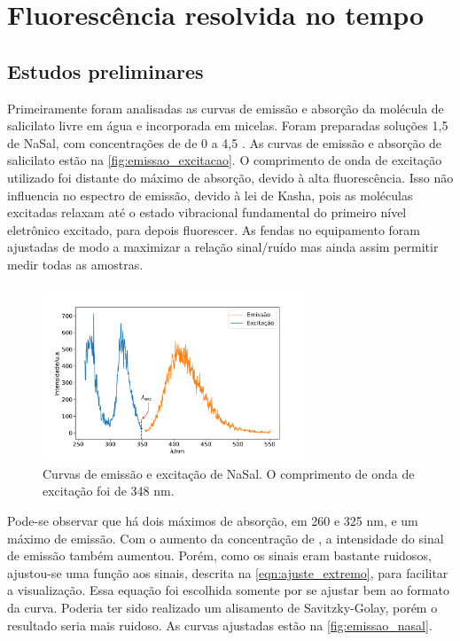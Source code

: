 	\chapter{Fluorescência resolvida no tempo}
	
	\section{Estudos preliminares}  
	
	Primeiramente foram analisadas as curvas de emissão e absorção da molécula de salicilato livre em água e incorporada em micelas. Foram preparadas soluções 1,5 \mM{} de NaSal, com concentrações de \TTAB{} de 0 a 4,5 \mM. As curvas de emissão e absorção de salicilato estão na \autoref{fig:emissao_excitacao}. O comprimento de onda de excitação utilizado foi distante do máximo de absorção, devido à alta fluorescência. Isso não influencia no espectro de emissão, devido à lei de Kasha, pois as moléculas excitadas relaxam até o estado vibracional fundamental do primeiro nível eletrônico excitado, para depois fluorescer. As fendas no equipamento foram ajustadas de modo a maximizar a relação sinal/ruído mas ainda assim permitir medir todas as amostras.
	
	\begin{figure}[h]
		\centering
		\includegraphics[width=0.7\textwidth]{imagens/fluor/emissao_excitacao}
		\caption{Curvas de emissão e excitação de NaSal. O comprimento de onda de excitação foi de 348 nm.}
		\label{fig:emissao_excitacao}
	\end{figure}

	Pode-se observar que há dois máximos de absorção, em 260 e 325 nm, e um máximo de emissão. Com o aumento da concentração de \TTAB{}, a intensidade do sinal de emissão também aumentou. Porém, como os sinais eram bastante ruidosos, ajustou-se uma função aos sinais, descrita na \autoref{eqn:ajuste_extremo}, para facilitar a visualização. Essa equação foi escolhida somente por se ajustar bem ao formato da curva. Poderia ter sido realizado um alisamento de Savitzky-Golay, porém o resultado seria mais ruidoso. As curvas ajustadas estão na \autoref{fig:emissao_nasal}.

